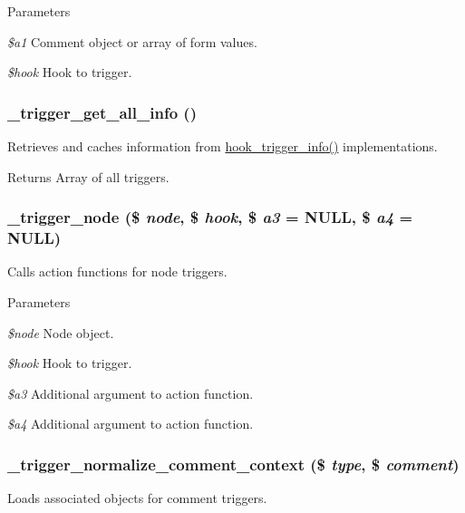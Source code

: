 \begin{DoxyParams}{Parameters}
\item[{\em \$a1}]Comment object or array of form values. \item[{\em \$hook}]Hook to trigger. \end{DoxyParams}
\hypertarget{trigger_8module_a89a56aa9ad5daffc9f638b4be46b7c08}{
\subsubsection[{\_\-trigger\_\-get\_\-all\_\-info}]{\setlength{\rightskip}{0pt plus 5cm}\_\-trigger\_\-get\_\-all\_\-info ()}}
\label{trigger_8module_a89a56aa9ad5daffc9f638b4be46b7c08}
Retrieves and caches information from \hyperlink{group__hooks_ga6796483976be1fa22589582444c6fdbb}{hook\_\-trigger\_\-info()} implementations.

\begin{DoxyReturn}{Returns}
Array of all triggers. 
\end{DoxyReturn}
\hypertarget{trigger_8module_a1337fc37c0ce68cd79d725179a48cba9}{
\subsubsection[{\_\-trigger\_\-node}]{\setlength{\rightskip}{0pt plus 5cm}\_\-trigger\_\-node (\$ {\em node}, \/  \$ {\em hook}, \/  \$ {\em a3} = {\ttfamily NULL}, \/  \$ {\em a4} = {\ttfamily NULL})}}
\label{trigger_8module_a1337fc37c0ce68cd79d725179a48cba9}
Calls action functions for node triggers.


\begin{DoxyParams}{Parameters}
\item[{\em \$node}]Node object. \item[{\em \$hook}]Hook to trigger. \item[{\em \$a3}]Additional argument to action function. \item[{\em \$a4}]Additional argument to action function. \end{DoxyParams}
\hypertarget{trigger_8module_ad3740e2f88ee061a1759d1e619d5747f}{
\subsubsection[{\_\-trigger\_\-normalize\_\-comment\_\-context}]{\setlength{\rightskip}{0pt plus 5cm}\_\-trigger\_\-normalize\_\-comment\_\-context (\$ {\em type}, \/  \$ {\em comment})}}
\label{trigger_8module_ad3740e2f88ee061a1759d1e619d5747f}
Loads associated objects for comment triggers.

